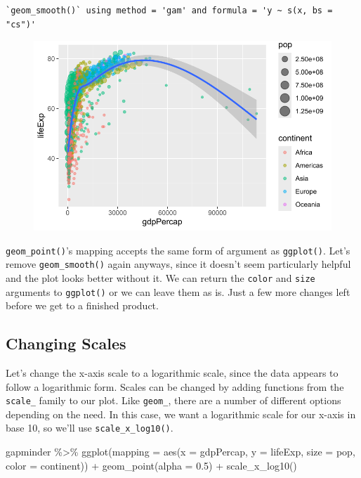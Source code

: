 \documentclass[
  letterpaper,
]{book}
\newenvironment{Shaded}{\begin{snugshade}}{\end{snugshade}}
\newcommand{\AttributeTok}[1]{\textcolor[rgb]{0.40,0.45,0.13}{#1}}
\newcommand{\FloatTok}[1]{\textcolor[rgb]{0.68,0.00,0.00}{#1}}
\newcommand{\FunctionTok}[1]{\textcolor[rgb]{0.28,0.35,0.67}{#1}}
\newcommand{\NormalTok}[1]{\textcolor[rgb]{0.00,0.23,0.31}{#1}}
\newcommand{\SpecialCharTok}[1]{\textcolor[rgb]{0.37,0.37,0.37}{#1}}
\begin{document}
\begin{verbatim}
`geom_smooth()` using method = 'gam' and formula = 'y ~ s(x, bs = "cs")'
\end{verbatim}

\begin{figure}[H]

{\centering \includegraphics{visualizing-with-ggplot_files/figure-pdf/unnamed-chunk-22-1.pdf}

}

\end{figure}

\texttt{geom\_point()}'s mapping accepts the same form of argument as
\texttt{ggplot()}. Let's remove \texttt{geom\_smooth()} again anyways,
since it doesn't seem particularly helpful and the plot looks better
without it. We can return the \texttt{color} and \texttt{size} arguments
to \texttt{ggplot()} or we can leave them as is. Just a few more changes
left before we get to a finished product.

\hypertarget{changing-scales}{%
\subsection{Changing Scales}\label{changing-scales}}

Let's change the x-axis scale to a logarithmic scale, since the data
appears to follow a logarithmic form. Scales can be changed by adding
functions from the \texttt{scale\_} family to our plot. Like
\texttt{geom\_}, there are a number of different options depending on
the need. In this case, we want a logarithmic scale for our x-axis in
base 10, so we'll use \texttt{scale\_x\_log10()}.

\begin{Shaded}
\begin{Highlighting}[]
\NormalTok{gapminder }\SpecialCharTok{\%\textgreater{}\%}
  \FunctionTok{ggplot}\NormalTok{(}\AttributeTok{mapping =} \FunctionTok{aes}\NormalTok{(}\AttributeTok{x =}\NormalTok{ gdpPercap, }
                       \AttributeTok{y =}\NormalTok{ lifeExp,}
                       \AttributeTok{size =}\NormalTok{ pop,}
                       \AttributeTok{color =}\NormalTok{ continent)) }\SpecialCharTok{+}
  \FunctionTok{geom\_point}\NormalTok{(}\AttributeTok{alpha =} \FloatTok{0.5}\NormalTok{) }\SpecialCharTok{+}
  \FunctionTok{scale\_x\_log10}\NormalTok{()}
\end{Highlighting}
\end{Shaded}
\end{document}
